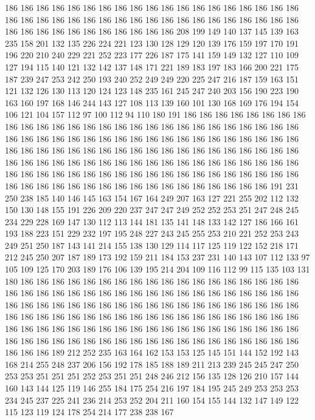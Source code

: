 186 186 186 186 186 186 186 186 186 186 186 186 186 186 186 186 186 186 186 186
186 186 186 186 186 186 186 186 186 186 186 186 186 186 186 186 186 186 186 186
186 186 186 186 186 186 186 186 186 208 199 149 140 137 145 139 163 235 158 201
132 135 226 224 221 123 130 128 129 120 139 176 159 197 170 191 196 220 210 240
229 221 252 223 177 226 187 175 141 159 149 132 127 110 109 127 194 115 140 121
132 142 137 148 171 221 189 183 197 183 166 200 221 175 187 239 247 253 242 250
193 240 252 249 249 220 225 247 216 187 159 163 151 121 132 126 130 113 120 124
123 148 235 161 245 247 240 203 156 190 223 190 163 160 197 168 146 244 143 127
108 113 139 160 101 130 168 169 176 194 154 106 121 104 157 112 97 100 112 94
110 180 191 186 186 186 186 186 186 186 186 186 186 186 186 186 186 186 186 186
186 186 186 186 186 186 186 186 186 186 186 186 186 186 186 186 186 186 186 186
186 186 186 186 186 186 186 186 186 186 186 186 186 186 186 186 186 186 186 186
186 186 186 186 186 186 186 186 186 186 186 186 186 186 186 186 186 186 186 186
186 186 186 186 186 186 186 186 186 186 186 186 186 186 186 186 186 186 186 186
186 186 186 186 186 186 186 186 186 186 186 186 186 186 186 186 186 186 186 186
186 186 186 191 231 250 238 185 140 146 145 163 154 167 164 249 207 163 127 221
255 202 112 132 150 130 148 155 191 226 209 220 237 247 247 249 252 252 253 251
247 248 245 234 229 228 169 147 130 112 113 144 181 135 141 148 133 142 127 186
166 161 193 188 223 151 229 232 197 195 248 227 243 245 255 253 210 221 252 253
243 249 251 250 187 143 141 214 155 138 130 129 114 117 125 119 122 152 218 171
212 245 250 207 187 189 173 192 159 211 184 153 237 231 140 143 107 112 133 97
105 109 125 170 203 189 176 106 139 195 214 204 109 116 112 99 115 135 103 131
180 186 186 186 186 186 186 186 186 186 186 186 186 186 186 186 186 186 186 186
186 186 186 186 186 186 186 186 186 186 186 186 186 186 186 186 186 186 186 186
186 186 186 186 186 186 186 186 186 186 186 186 186 186 186 186 186 186 186 186
186 186 186 186 186 186 186 186 186 186 186 186 186 186 186 186 186 186 186 186
186 186 186 186 186 186 186 186 186 186 186 186 186 186 186 186 186 186 186 186
186 186 186 186 186 186 186 186 186 186 186 186 186 186 186 186 186 189 212 252
235 163 164 162 153 153 125 145 151 144 152 192 143 168 214 255 248 237 206 156
192 178 185 188 189 211 213 239 245 245 247 250 253 253 251 251 251 252 253 251
251 248 246 212 156 135 128 126 210 157 144 160 143 144 125 119 146 255 184 175
254 216 197 184 195 245 249 253 253 253 234 245 237 225 241 236 214 253 252 204
211 160 154 155 144 132 147 149 122 115 123 119 124 178 254 214 177 238 238 167
